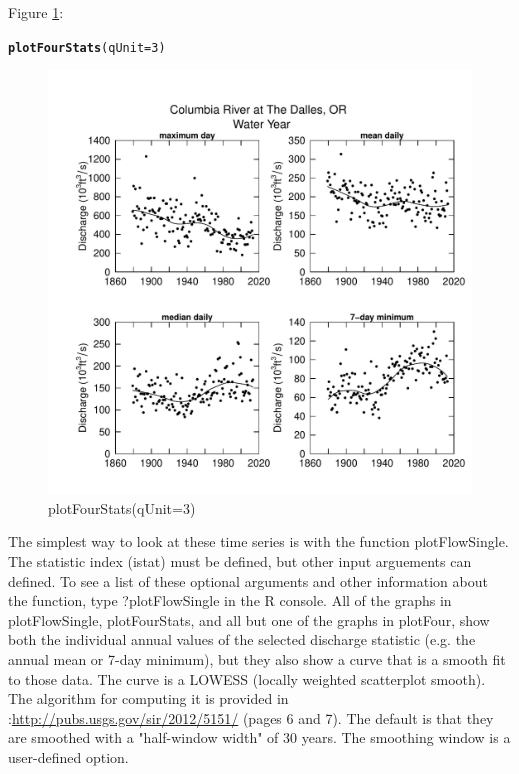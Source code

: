 \documentclass[a4paper,11pt]{article}\usepackage[]{graphicx}\usepackage[]{color}
\makeatletter
\newcommand{\hlnum}[1]{\textcolor[rgb]{0.686,0.059,0.569}{#1}}%
\newcommand{\hlstd}[1]{\textcolor[rgb]{0.345,0.345,0.345}{#1}}%
\newcommand{\hlkwc}[1]{\textcolor[rgb]{0.333,0.667,0.333}{#1}}%
\newcommand{\hlkwd}[1]{\textcolor[rgb]{0.737,0.353,0.396}{\textbf{#1}}}%
\newenvironment{kframe}{%
 \def\at@end@of@kframe{}%
 \ifinner\ifhmode%
  \def\at@end@of@kframe{\end{minipage}}%
  \begin{minipage}{\columnwidth}%
 \fi\fi%
 \def\FrameCommand##1{\hskip\@totalleftmargin \hskip-\fboxsep
 \colorbox{shadecolor}{##1}\hskip-\fboxsep
     \hskip-\linewidth \hskip-\@totalleftmargin \hskip\columnwidth}%
 \MakeFramed {\advance\hsize-\width
   \@totalleftmargin\z@ \linewidth\hsize
   \@setminipage}}%
 {\par\unskip\endMakeFramed%
 \at@end@of@kframe}
\newenvironment{knitrout}{}{} %
\makeatother
\begin{document}
Figure \ref{fig:plotFourStats}:
\begin{knitrout}
\color{fgcolor}\begin{kframe}
\begin{alltt}
\hlkwd{plotFourStats}\hlstd{(}\hlkwc{qUnit}\hlstd{=}\hlnum{3}\hlstd{)}
\end{alltt}
\end{kframe}\begin{figure}[]

\includegraphics[width=1\linewidth,height=1\linewidth]{figure/plotFourStats} \caption[plotFourStats(qUnit=3)]{plotFourStats(qUnit=3)\label{fig:plotFourStats}}
\end{figure}


\end{knitrout}



\FloatBarrier

The simplest way to look at these time series is with the function plotFlowSingle. The statistic index (istat) must be defined, but other input arguements can defined. To see a list of these optional arguments and other information about the function, type ?plotFlowSingle in the R console. All of the graphs in plotFlowSingle, plotFourStats, and all but one of the graphs in plotFour, show both the individual annual values of the selected discharge statistic (e.g. the annual mean or 7-day minimum), but they also show a curve that is a smooth fit to those data.  The curve is a LOWESS (locally weighted scatterplot smooth).  The algorithm for computing it is provided in \cite{HirschV}:\url{http://pubs.usgs.gov/sir/2012/5151/}  (pages 6 and 7).  The default is that they are smoothed with a "half-window width" of 30 years.  The smoothing window is a user-defined option. 
\end{document}
